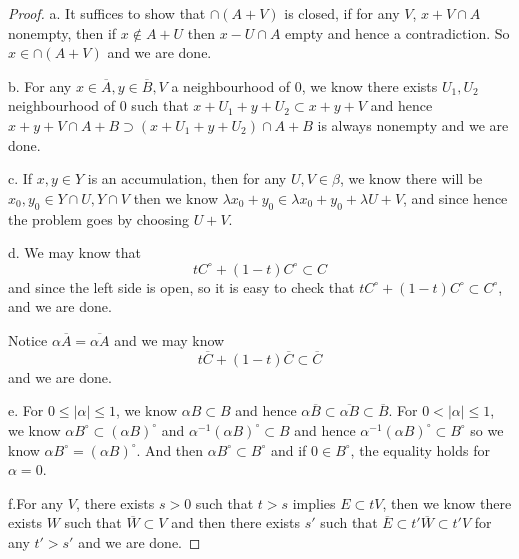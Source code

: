 \documentclass[lang=en, color=blue, ]{elegantbook}
\begin{document}
\begin{proof}
    a. It suffices to show that $\cap (A+V)$ is closed, if for any $V$, $x+V \cap A$ nonempty, then if $x\notin A+ U$ then $x - U \cap A$ empty and hence a contradiction. So $x \in \cap (A+V)$ and we are done.\par
    b. For any $x\in \overline{A}, y \in \overline{B}, V$ a neighbourhood of $0$, we know there exists $U_1,U_2$ neighbourhood of $0$ such that $x+U_1+y+U_2 \subset x+y + V$ and hence $x+y+V \cap A+B \supset (x+U_1+y+U_2) \cap A+B$ is always nonempty and we are done.\par
    c. If $x,y\in Y$ is an accumulation, then for any $U,V\in\beta$, we know there will be $x_0,y_0 \in Y\cap U, Y\cap V$ then we know $\lambda x_0 + y_0 \in \lambda x_0 + y_0 + \lambda U+ V$, and since hence the problem goes by choosing $U+V$.\par
    d. We may know that
    \[tC^{\circ} + (1-t)C^{\circ} \subset C\]
    and since the left side is open, so it is easy to check that $tC^{\circ} + (1-t)C^{\circ} \subset C^{\circ}$, and we are done.\par
    Notice $\alpha \overline{A} = \overline{\alpha A}$ and we may know
    \[
    t\overline{C} + (1-t)\overline{C} \subset \overline{C}
    \] 
    and we are done.\par
    e. For $0 \leq |\alpha| \leq 1$, we know $\alpha B \subset B$ and hence $\alpha\overline{B} \subset \overline{\alpha B} \subset \overline{B}$. For $0<|\alpha| \leq 1$, we know $\alpha B^{\circ} \subset (\alpha B)^{\circ}$ and $\alpha^{-1}(\alpha B)^{\circ} \subset B$ and hence $\alpha^{-1}(\alpha B)^{\circ} \subset B^{\circ}$ so we know $\alpha B^{\circ} = (\alpha B)^{\circ}$. And then $\alpha B^{\circ} \subset B^{\circ}$ and if $0\in B^{\circ}$, the equality holds for $\alpha =0 $.\par
    f.For any $V$, there exists $s>0$ such that $t>s$ implies $E\subset tV$, then we know there exists $W$ such that $\overline{W} \subset V$ and then there exists $s'$ such that $\overline{E}\subset t'\overline{W} \subset t'V$ for any $t'> s'$ and we are done.
\end{proof}
\end{document}
